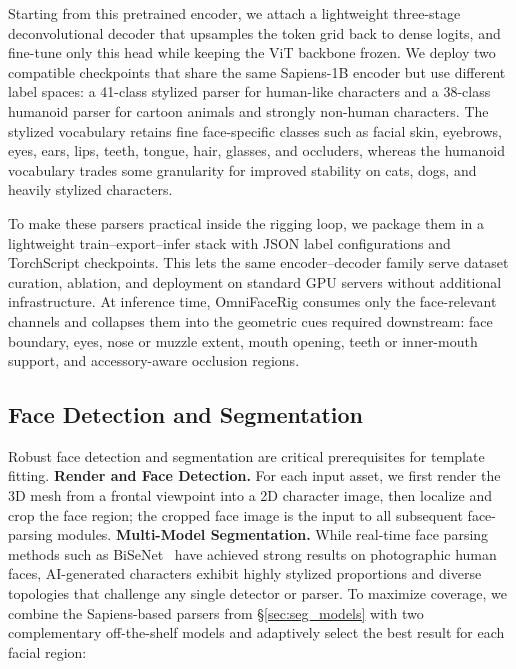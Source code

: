 \documentclass[acmtog,anonymous,review]{acmart}
\begin{document}
Starting from this pretrained encoder, we attach a lightweight three-stage deconvolutional decoder that upsamples the token grid back to dense logits, and fine-tune only this head while keeping the ViT backbone frozen. We deploy two compatible checkpoints that share the same Sapiens-1B encoder but use different label spaces: a 41-class stylized parser for human-like characters and a 38-class humanoid parser for cartoon animals and strongly non-human characters. The stylized vocabulary retains fine face-specific classes such as facial skin, eyebrows, eyes, ears, lips, teeth, tongue, hair, glasses, and occluders, whereas the humanoid vocabulary trades some granularity for improved stability on cats, dogs, and heavily stylized characters.

To make these parsers practical inside the rigging loop, we package them in a lightweight train--export--infer stack with JSON label configurations and TorchScript checkpoints. This lets the same encoder--decoder family serve dataset curation, ablation, and deployment on standard GPU servers without additional infrastructure. At inference time, OmniFaceRig consumes only the face-relevant channels and collapses them into the geometric cues required downstream: face boundary, eyes, nose or muzzle extent, mouth opening, teeth or inner-mouth support, and accessory-aware occlusion regions.



\subsection{Face Detection and Segmentation}
\label{sec:segmentation}

Robust face detection and segmentation are critical prerequisites for template fitting. \textbf{Render and Face Detection.} For each input asset, we first render the 3D mesh from a frontal viewpoint into a 2D character image, then localize and crop the face region; the cropped face image is the input to all subsequent face-parsing modules. \textbf{Multi-Model Segmentation.} While real-time face parsing methods such as BiSeNet~\cite{yu2018bisenet} have achieved strong results on photographic human faces, AI-generated characters exhibit highly stylized proportions and diverse topologies that challenge any single detector or parser. To maximize coverage, we combine the Sapiens-based parsers from \S\ref{sec:seg_models} with two complementary off-the-shelf models and adaptively select the best result for each facial region:
\end{document}

